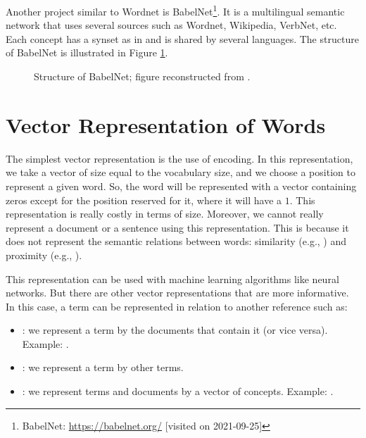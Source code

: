 \documentclass{KBook}
\begin{document}
Another project similar to Wordnet is BabelNet\footnote{BabelNet: \url{https://babelnet.org/} [visited on 2021-09-25]}.
It is a multilingual semantic network that uses several sources such as Wordnet, Wikipedia, VerbNet, etc. 
Each concept has a synset as in  and is shared by several languages. 
The structure of BabelNet is illustrated in Figure \ref{fig:babelnet-struc}.
\begin{figure}[ht]
	\caption[Structure of BabelNet.]{Structure of BabelNet; figure reconstructed from \cite{2012-navigli-ponzetto}.}
	\label{fig:babelnet-struc}
\end{figure}


\section{Vector Representation of Words}

The simplest vector representation is the use of  encoding. 
In this representation, we take a vector of size equal to the vocabulary size, and we choose a position to represent a given word. 
So, the word will be represented with a vector containing zeros except for the position reserved for it, where it will have a $1$. 
This representation is really costly in terms of size. 
Moreover, we cannot really represent a document or a sentence using this representation. 
This is because it does not represent the semantic relations between words: similarity (e.g., ) and proximity (e.g., ). 

This representation can be used with machine learning algorithms like neural networks.
But there are other vector representations that are more informative. 
In this case, a term can be represented in relation to another reference such as: 
\begin{itemize}
	\item {} : we represent a term by the documents that contain it (or vice versa).
	Example: .
	
	\item {} : we represent a term by other terms.
	
	\item {} : we represent terms and documents by a vector of concepts.
	Example: .
\end{itemize}
\end{document}
